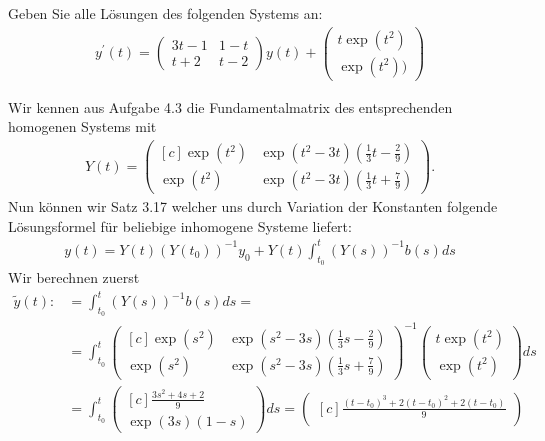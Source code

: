 \begin{exercise}
Geben Sie alle Lösungen des folgenden Systems an:
\begin{align*}
  y^{\prime}(t) = \begin{pmatrix}
    3t -1 & 1 - t \\ t + 2 & t - 2
  \end{pmatrix}
  y(t) +
  \begin{pmatrix}
    t\exp(t^2) \\ \exp(t^2))
  \end{pmatrix}
\end{align*}
\end{exercise}
\begin{solution}
Wir kennen aus Aufgabe 4.3 die Fundamentalmatrix des entsprechenden homogenen Systems mit
\begin{align*}
Y(t) = \begin{pmatrix*}[c]
  \exp(t^2) & \exp(t^2-3t)(\frac{1}{3}t - \frac{2}{9}) \\
  \exp(t^2) & \exp(t^2-3t)(\frac{1}{3}t + \frac{7}{9})
\end{pmatrix*}.
\end{align*}
Nun können wir Satz 3.17 welcher uns durch Variation der Konstanten folgende
Lösungsformel für beliebige inhomogene Systeme liefert:
\begin{align*}
  y(t) = Y(t)(Y(t_0))^{-1}y_0 + Y(t)\int_{t_0}^{t}(Y(s))^{-1}b(s)ds
\end{align*}
Wir berechnen zuerst
\begin{align*}
  \tilde{y}(t) :&= \int_{t_0}^{t}(Y(s))^{-1}b(s)ds = \\
  &=
  \int_{t_0}^{t}  \begin{pmatrix*}[c]
      \exp(s^2) & \exp(s^2-3s)(\frac{1}{3}s - \frac{2}{9}) \\
      \exp(s^2) & \exp(s^2-3s)(\frac{1}{3}s + \frac{7}{9})
    \end{pmatrix*}^{-1}
    \begin{pmatrix}
      t\exp(t^2) \\ \exp(t^2)
    \end{pmatrix}ds \\
    & = \int_{t_0}^{t}  \begin{pmatrix*}[c]
      \frac{3s^2 + 4s + 2}{9} \\
      \exp(3s)(1 - s)
    \end{pmatrix*}ds = \begin{pmatrix*}[c]
      \frac{(t-t_0)^3 + 2(t-t_0)^2 + 2(t-t_0)}{9} \\

\end{pmatrix*}
\end{align*}
\end{solution}
